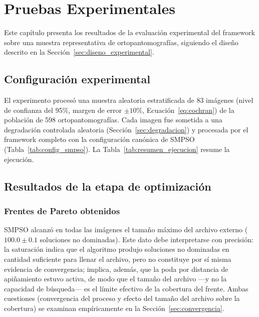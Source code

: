 \chapter{Pruebas Experimentales} %
\label{Chapter5}


Este capítulo presenta los resultados de la evaluación experimental del framework sobre una muestra representativa de ortopantomografías, siguiendo el diseño descrito en la Sección~\ref{sec:diseno_experimental}.

\section{Configuración experimental}

El experimento procesó una muestra aleatoria estratificada de 83 imágenes (nivel de confianza del 95\%, margen de error $\pm 10\%$, Ecuación~\ref{eq:cochran}) de la población de 598 ortopantomografías. Cada imagen fue sometida a una degradación controlada aleatoria (Sección~\ref{sec:degradacion}) y procesada por el framework completo con la configuración canónica de SMPSO (Tabla~\ref{tab:config_smpso}). La Tabla~\ref{tab:resumen_ejecucion} resume la ejecución.

\begin{table}[H]
\centering
\caption[Resumen de la ejecución experimental]{Resumen de la ejecución experimental.}
\label{tab:resumen_ejecucion}

\end{table}

\section{Resultados de la etapa de optimización}

\subsection{Frentes de Pareto obtenidos}

SMPSO alcanzó en todas las imágenes el tamaño máximo del archivo externo ($100.0 \pm 0.1$ soluciones no dominadas). Este dato debe interpretarse con precisión: la saturación indica que el algoritmo produjo soluciones no dominadas en cantidad suficiente para llenar el archivo, pero no constituye por sí misma evidencia de convergencia; implica, además, que la poda por distancia de apiñamiento estuvo activa, de modo que el tamaño del archivo ---y no la capacidad de búsqueda--- es el límite efectivo de la cobertura del frente. Ambas cuestiones (convergencia del proceso y efecto del tamaño del archivo sobre la cobertura) se examinan empíricamente en la Sección~\ref{sec:convergencia}.

